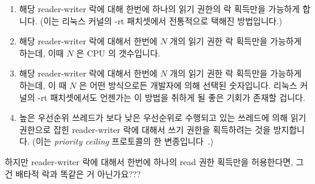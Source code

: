 \begin{enumerate}
\item	해당 reader-writer 락에 대해 한번에 하나의 읽기 권한의 락 획득만을
	가능하게 합니다.  (이는 리눅스 커널의 -rt 패치셋에서 전통적으로 택해진
	방법입니다.)
\item	해당 reader-writer 락에 대해서 한번에 $N$ 개의 읽기 권한 락 획득만을
	가능하게 하는데, 이때 $N$ 은 CPU 의 갯수입니다.
\item	해당 reader-writer 락에 대해서 한번에 $N$ 개의 읽기 권한 락 획득만을
	가능하게 하는데, 이 때 $N$ 은 어떤 방식으로든 개발자에 의해 선택된
	숫자입니다.
	리눅스 커널의 -rt 패치셋에서도 언젠가는 이 방법을 취하게 될 좋은 기회가
	존재할 겁니다.
\item	높은 우선순위 쓰레드가 보다 낮은 우선순위로 수행되고 있는 쓰레드에 의해
	읽기 권한으로 잡힌 reader-writer 락에 대해서 쓰기 권한을 획득하려는
	것을 방지합니다.
	(이는 \emph{priority ceiling} 프로토콜의 한
	변종입니다~\cite{LuiSha1990PriorityInheritance}.)

\end{enumerate}

\QuickQuiz{}
	하지만 reader-writer 락에 대해서 한번에 하나의 read 권한 획득만을
	허용한다면, 그건 배타적 락과 똑같은 거 아닌가요???
	\iffalse

